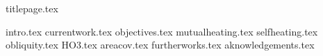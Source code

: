 \documentclass[twoside, twocolumn]{article}
\begin{document}
{titlepage.tex}

{intro.tex}
{currentwork.tex}
{objectives.tex}
{mutualheating.tex}
{selfheating.tex}
{obliquity.tex}
{HO3.tex}
{areacov.tex}
{furtherworks.tex}
{aknowledgements.tex}

\nocite{*}
\end{document}
